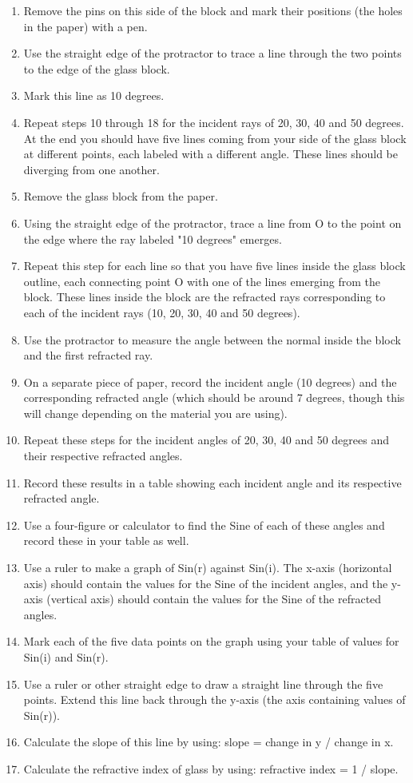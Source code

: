 \begin{enumerate}
\item{Remove the pins on this side of the block and mark their positions (the holes in the paper) with a pen.} 
\item{Use the straight edge of the protractor to trace a line through the two points to the edge of the glass block.} 
\item{Mark this line as 10 degrees.} 
\item{Repeat steps 10 through 18 for the incident rays of 20, 30, 40 and 50 degrees. At the end you should have five lines coming from your side of the glass block at different points, each labeled with a different angle. These lines should be diverging from one another.} 
\item{Remove the glass block from the paper.} 
\item{Using the straight edge of the protractor, trace a line from O to the point on the edge where the ray labeled "10 degrees" emerges.} 
\item{Repeat this step for each line so that you have five lines inside the glass block outline, each connecting point O with one of the lines emerging from the block. These lines inside the block are the refracted rays corresponding to each of the incident rays (10, 20, 30, 40 and 50 degrees).} 
\item{Use the protractor to measure the angle between the normal inside the block and the first refracted ray.} 
\item{On a separate piece of paper, record the incident angle (10 degrees) and the corresponding refracted angle (which should be around 7 degrees, though this will change depending on the material you are using).} 
\item{Repeat these steps for the incident angles of 20, 30, 40 and 50 degrees and their respective refracted angles.} 
\item{Record these results in a table showing each incident angle and its respective refracted angle.} 
\item{Use a four-figure or calculator to find the Sine of each of these angles and record these in your table as well.} 
\item{Use a ruler to make a graph of Sin(r) against Sin(i). The x-axis (horizontal axis) should contain the values for the Sine of the incident angles, and the y-axis (vertical axis) should contain the values for the Sine of the refracted angles.} 
\item{Mark each of the five data points on the graph using your table of values for Sin(i) and Sin(r).} 
\item{Use a ruler or other straight edge to draw a straight line through the five points. Extend this line back through the y-axis (the axis containing values of Sin(r)).} 
\item{Calculate the slope of this line by using: slope = change in y / change in x.} 
\item{Calculate the refractive index of glass by using: refractive index = 1 / slope.} 
\end{enumerate}

